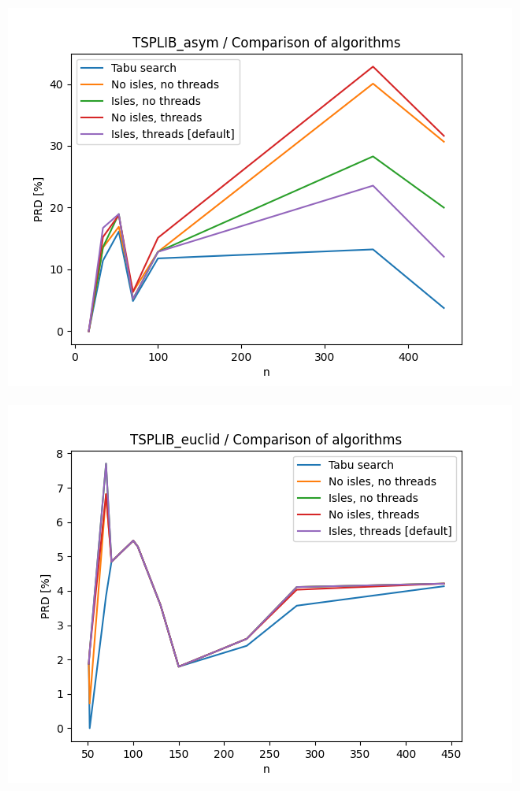 \documentclass{article}
\begin{document}
\begin{center}
\includegraphics[width=\textwidth, 
                   height = 0.4\textheight, 
                   keepaspectratio]
                  {plots/tsplib_asym_1_comparison} 
\end{center}

\begin{center}
\includegraphics[width=\textwidth, 
                   height = 0.4\textheight, 
                   keepaspectratio]
                  {plots/tsplib_euclid_1_comparison} 
\end{center}
\end{document}

